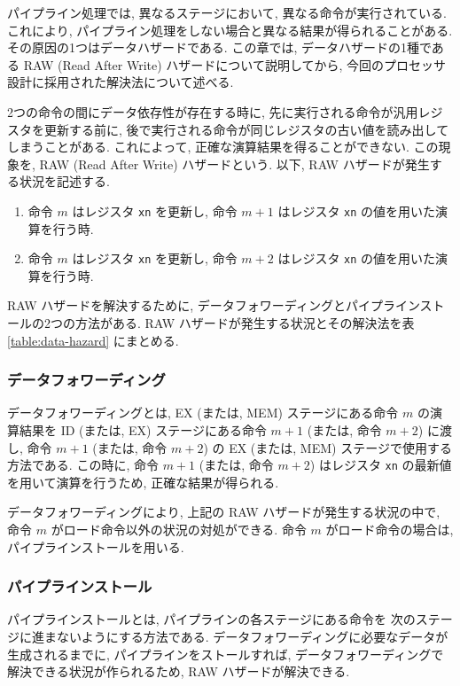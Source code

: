 \documentclass[../specifications.tex]{subfiles}
\begin{document}
  パイプライン処理では, 異なるステージにおいて, 異なる命令が実行されている.
  これにより, パイプライン処理をしない場合と異なる結果が得られることがある.
  その原因の1つはデータハザードである.
  この章では, データハザードの1種である RAW (Read After Write) ハザードについて説明してから, 
  今回のプロセッサ設計に採用された解決法について述べる.

  2つの命令の間にデータ依存性が存在する時に, 
  先に実行される命令が汎用レジスタを更新する前に, 
  後で実行される命令が同じレジスタの古い値を読み出してしまうことがある.
  これによって, 正確な演算結果を得ることができない.
  この現象を, RAW (Read After Write) ハザードという.
  以下, RAW ハザードが発生する状況を記述する.

  \begin{enumerate}
    \item 命令 $m$ はレジスタ \verb|xn| を更新し, 
    命令 $m+1$ はレジスタ \verb|xn| の値を用いた演算を行う時.

    \item 命令 $m$ はレジスタ \verb|xn| を更新し, 
    命令 $m+2$ はレジスタ \verb|xn| の値を用いた演算を行う時.
  \end{enumerate}

  RAW ハザードを解決するために, データフォワーディングとパイプラインストールの2つの方法がある.
  RAW ハザードが発生する状況とその解決法を表 \ref{table:data-hazard} にまとめる.

  \subsubsection{データフォワーディング}
  データフォワーディングとは, EX (または, MEM) ステージにある命令 $m$ の演算結果を
  ID (または, EX) ステージにある命令 $m+1$ (または, 命令 $m+2$) に渡し, 
  命令 $m+1$ (または, 命令 $m+2$) の EX (または, MEM) ステージで使用する方法である.
  この時に, 命令 $m+1$ (または, 命令 $m+2$) はレジスタ \verb|xn| の最新値
  を用いて演算を行うため, 正確な結果が得られる.

  データフォワーディングにより, 上記の RAW ハザードが発生する状況の中で, 
  命令 $m$ がロード命令以外の状況の対処ができる.
  命令 $m$ がロード命令の場合は, パイプラインストールを用いる.

  \subsubsection{パイプラインストール}
  パイプラインストールとは, パイプラインの各ステージにある命令を
  次のステージに進まないようにする方法である.
  データフォワーディングに必要なデータが生成されるまでに, 
  パイプラインをストールすれば, データフォワーディングで解決できる状況が作られるため, 
  RAW ハザードが解決できる.
\end{document}
